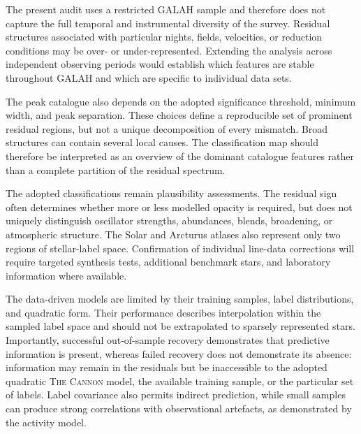 \documentclass[twocolumn,apj,numberedappendix,appendixfloats]{openjournal}
\begin{document}
The present audit uses a restricted GALAH sample and therefore does not capture the full temporal and instrumental diversity of the survey. Residual structures associated with particular nights, fields, velocities, or reduction conditions may be over- or under-represented. Extending the analysis across independent observing periods would establish which features are stable throughout GALAH and which are specific to individual data sets.

The peak catalogue also depends on the adopted significance threshold, minimum width, and peak separation. These choices define a reproducible set of prominent residual regions, but not a unique decomposition of every mismatch. Broad structures can contain several local causes. The classification map should therefore be interpreted as an overview of the dominant catalogue features rather than a complete partition of the residual spectrum.

The adopted classifications remain plausibility assessments. The residual sign often determines whether more or less modelled opacity is required, but does not uniquely distinguish oscillator strengths, abundances, blends, broadening, or atmospheric structure. The Solar and Arcturus atlases also represent only two regions of stellar-label space. Confirmation of individual line-data corrections will require targeted synthesis tests, additional benchmark stars, and laboratory information where available.
 
The data-driven models are limited by their training samples, label distributions, and quadratic form. Their performance describes interpolation within the sampled label space and should not be extrapolated to sparsely represented stars. Importantly, successful out-of-sample recovery demonstrates that predictive information is present, whereas failed recovery does not demonstrate its absence: information may remain in the residuals but be inaccessible to the adopted quadratic \textsc{The Cannon} model, the available training sample, or the particular set of labels. Label covariance also permits indirect prediction, while small samples can produce strong correlations with observational artefacts, as demonstrated by the activity model.
\end{document}
